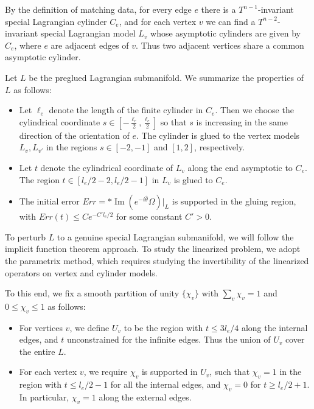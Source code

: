 \documentclass{article}
\theoremstyle{definition}
\begin{document}
	
	
	
	
 By the definition of matching data, for every
	edge $e$ there is a $T^{n-1}$-invariant special
	Lagrangian cylinder $C_e$, and for each vertex $v$ we
	can find a $T^{n-2}$-invariant special Lagrangian model $L_v$ whose
	asymptotic cylinders are given by $C_e$, where $e$ are adjacent edges
	of $v$. Thus two adjacent vertices share a common asymptotic cylinder.
	
	Let $L$ be the preglued Lagrangian submanifold. We summarize the
	properties of $L$ as follows:
	
	\begin{itemize}
		
		\item Let $\ell_e$ denote the length of the finite cylinder in
		$C_e$. Then we choose the cylindrical coordinate
		$s \in [-\frac{\ell_e}{2},\frac{\ell_e}{2}]$ so that $s$ is
		increasing in the same direction of the orientation of $e$. The
		cylinder is glued to the vertex models $L_v, L_{v'}$ in the regions
		$s\in [-2, -1]$ and
		$[1, 2]$, respectively.
		
		
		\item Let $t$ denote the cylindrical coordinate of $L_v$ along the end
		asymptotic to $C_e$. The region $t \in [l_e/2-2, l_e/2-1]$ in $L_v$ is glued to
		$C_e$.
		
		\item The initial error
		$Err = *\operatorname{Im}(e^{-i\hat\theta}\Omega)|_{L}$ is
		supported in the gluing region, with $Err(t) \le Ce^{-C' l_e/2}$ for
		some constant $C'>  0$.
	\end{itemize}
	
	
	
	
	To perturb $L$ to a genuine special Lagrangian submanifold, we will
	follow the implicit function theorem approach. To study the
	linearized problem, we adopt the parametrix method, which requires
	studying the invertibility of the linearized operators on vertex and
	cylinder models.
	
	To this end, we fix a smooth partition of unity $\{ \chi_v\}$ with $\sum_v \chi_v=1$ and $0\leq \chi_v\leq 1$ as follows:
	
	\begin{itemize}
		
		\item For vertices $v$, we define $U_v$ to be the region with $t\leq3l_e/4$ along the internal edges, and $t$ unconstrained for the infinite edges. Thus the union of $U_v$ cover the entire $L$.
		
		
		\item  For each vertex $v$, we require
		$ \chi_v $ is supported in $U_v$, such that $\chi_v=1$ in the region with $t\leq l_e/2-1$ for all the internal edges, and $\chi_v=0$ for $t\geq l_e/2+1$. In particular, $\chi_v=1$ along the external edges.
		
		
		
	\end{itemize}
	
\end{document}
